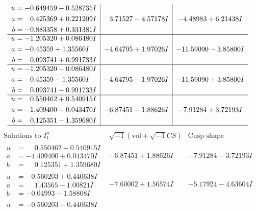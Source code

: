 \documentclass[1p]{elsarticle_modified}
\theoremstyle{definition}
\newcommand{\I}{\sqrt{-1}}
\begin{document}
$$\begin{array}{c|c|c}
\begin{aligned}
u &= -0.649459 - 0.528735 I \\
a &= \phantom{-}0.425369 + 0.221209 I \\
b &= -0.883358 + 0.331381 I\end{aligned}
 & \phantom{-}3.71527 - 4.57178 I & -4.48983 + 6.21438 I \\ \hline\begin{aligned}
u &= -1.205320 + 0.086480 I \\
a &= -0.45359 + 1.35560 I \\
b &= \phantom{-}0.093741 + 0.991733 I\end{aligned}
 & -4.64795 + 1.97026 I & -11.59090 - 3.85800 I \\ \hline\begin{aligned}
u &= -1.205320 - 0.086480 I \\
a &= -0.45359 - 1.35560 I \\
b &= \phantom{-}0.093741 - 0.991733 I\end{aligned}
 & -4.64795 - 1.97026 I & -11.59090 + 3.85800 I \\ \hline\begin{aligned}
u &= \phantom{-}0.550462 + 0.540915 I \\
a &= -1.409400 - 0.043470 I \\
b &= \phantom{-}0.125351 - 1.359680 I\end{aligned}
 & -6.87451 - 1.88626 I & -7.91284 + 3.72193 I\\
 \hline 
 \end{array}$$\newpage$$\begin{array}{c|c|c}  
\text{Solutions to }I^u_{1}& \I (\text{vol} + \sqrt{-1}CS) & \text{Cusp shape}\\
 \hline 
\begin{aligned}
u &= \phantom{-}0.550462 - 0.540915 I \\
a &= -1.409400 + 0.043470 I \\
b &= \phantom{-}0.125351 + 1.359680 I\end{aligned}
 & -6.87451 + 1.88626 I & -7.91284 - 3.72193 I \\ \hline\begin{aligned}
u &= -0.560203 + 0.440638 I \\
a &= \phantom{-}1.43565 - 1.00821 I \\
b &= -0.04993 - 1.58808 I\end{aligned}
 & -7.60002 + 1.56574 I & -5.17924 - 4.63604 I \\ \hline\begin{aligned}
u &= -0.560203 - 0.440638 I \\

\end{aligned}
\end{array}$$
\end{document}
